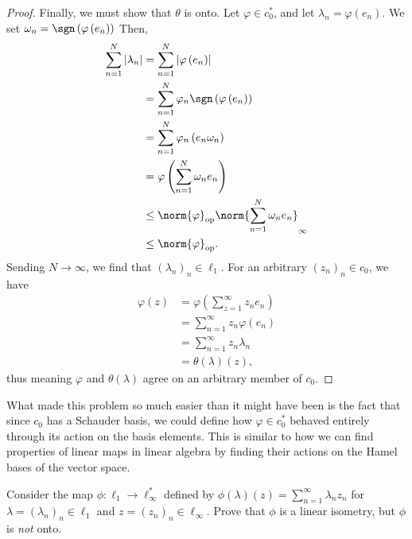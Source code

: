 \documentclass[10pt]{mypackage}
\begin{document}
\begin{proof}
  Finally, we must show that $\theta$ is onto. Let $\varphi\in c_0^{\ast}$, and let $\lambda_n = \varphi\left(e_n\right)$. We set $\omega_n = \sgn\left(\varphi\left(e_n\right)\right)$ Then,
  \begin{align*}
    \sum_{n=1}^{N}\left\vert \lambda_n \right\vert &= \sum_{n=1}^{N}\left\vert \varphi\left(e_n\right) \right\vert\\
                                                   &= \sum_{n=1}^{N}\varphi_n\sgn\left(\varphi\left(e_n\right)\right)\\
                                                   &= \sum_{n=1}^{N}\varphi_n\left(e_n\omega_n\right)\\
                                                   &= \varphi\left(\sum_{n=1}^{N}\omega_ne_n\right)\\
                                                   &\leq \norm{\varphi}_{\text{op}}\norm{\sum_{n=1}^{N}\omega_ne_n}_{\infty}\\ %
                                                   &\leq \norm{\varphi}_{\text{op}}.
  \end{align*}
  Sending $N\rightarrow\infty$, we find that $\left(\lambda_n\right)_n\in \ell_1$. For an arbitrary $\left(z_n\right)_n\in c_0$, we have
  \begin{align*}
    \varphi\left(z\right) &= \varphi\left(\sum_{z=1}^{\infty}z_ne_n\right)\\
                          &= \sum_{n=1}^{\infty}z_n\varphi\left(e_n\right)\\
                          &= \sum_{n=1}^{\infty}z_n\lambda_n\\
                          &= \theta\left(\lambda\right)\left(z\right),
  \end{align*}
  thus meaning $\varphi$ and $\theta\left(\lambda\right)$ agree on an arbitrary member of $c_0$.
\end{proof}
\begin{remark}
  What made this problem so much easier than it might have been is the fact that since $c_0$ has a Schauder basis, we could define how $\varphi\in c_0^{\ast}$ behaved entirely through its action on the basis elements. This is similar to how we can find properties of linear maps in linear algebra by finding their actions on the Hamel bases of the vector space.
\end{remark}
\begin{exercise}
  Consider the map $\phi: \ell_1\rightarrow \ell_{\infty}^{\ast}$ defined by $\phi\left(\lambda\right)\left(z\right) = \sum_{n=1}^{\infty}\lambda_nz_n$ for $\lambda = \left(\lambda_n\right)_n\in \ell_1$ and $z = \left(z_n\right)_n\in \ell_{\infty}$. Prove that $\phi$ is a linear isometry, but $\phi$ is \textit{not} onto.
\end{exercise}
\end{document}
